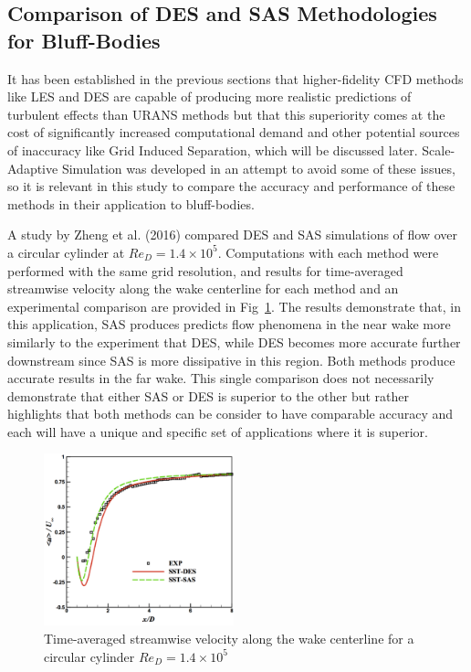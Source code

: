 \documentclass[journal]{new-aiaa}
\begin{document}
\subsection{Comparison of DES and SAS Methodologies for Bluff-Bodies} \label{subsec:desvssas}

It has been established in the previous sections that higher-fidelity CFD methods like LES and DES are capable of producing more realistic predictions of turbulent effects than URANS methods but that this superiority comes at the cost of significantly increased computational demand and other potential sources of inaccuracy like Grid Induced Separation, which will be discussed later. Scale-Adaptive Simulation was developed in an attempt to avoid some of these issues, so it is relevant in this study to compare the accuracy and performance of these methods in their application to bluff-bodies.

A study by Zheng et al. (2016) \cite{zheng2016comparative} compared DES and SAS simulations of flow over a circular cylinder at $Re_D = 1.4 \times 10^5$. Computations with each method were performed with the same grid resolution, and results for time-averaged streamwise velocity along the wake centerline for each method and an experimental comparison are provided in Fig~\ref{fig:cylinderdesvssas}. The results demonstrate that, in this application, SAS produces predicts flow phenomena in the near wake more similarly to the experiment that DES, while DES becomes more accurate further downstream since SAS is more dissipative in this region. Both methods produce accurate results in the far wake. This single comparison does not necessarily demonstrate that either SAS or DES is superior to the other but rather highlights that both methods can be consider to have comparable accuracy and each will have a unique and specific set of applications where it is superior.




\begin{figure}[H]
\begin{center}
\includegraphics[width=0.49\textwidth]{Images/logan/zheng2016comparative_WakeVelocity.pdf}
\caption{ Time-averaged streamwise velocity along the wake centerline for a circular cylinder $Re_D = 1.4 \times 10^5$ \cite{zheng2016comparative} }
\label{fig:cylinderdesvssas}
\end{center}
\end{figure}
\end{document}
